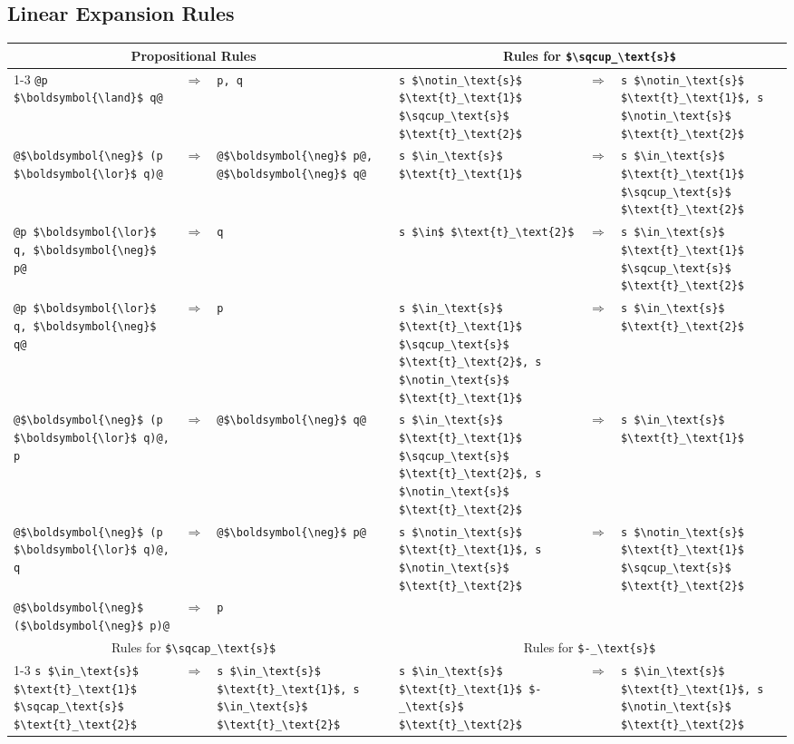 \documentclass[sigplan,10pt,anonymous,review]{acmart}
\newcommand{\unionS}{\sqcup_\text{s}}
\newcommand{\interS}{\sqcap_\text{s}}
\newcommand{\diffS}{-_\text{s}}
\newcommand{\inS}{\in_\text{s}}
\newcommand{\notinS}{\notin_\text{s}}
\newcommand{\fmAnd}[2]{#1 $\boldsymbol{\land}$ #2}
\newcommand{\fmOr}[2]{#1 $\boldsymbol{\lor}$ #2}
\newcommand{\fmNegSymbol}{\boldsymbol{\neg}}
\newcommand{\fmNeg}[1]{$\fmNegSymbol$ #1}
\begin{document}
\subsection{Linear Expansion Rules}
\begin{table*}
  \newcommand{\ton}{\text{t}_\text{1}}
  \newcommand{\ttw}{\text{t}_\text{2}}
  \begin{tabular}{p{}cp{} p{} p{}cp{}}
    \toprule
    \multicolumn{3}{c}{Propositional Rules} && \multicolumn{3}{c}{Rules for \lstinline!$\unionS$!} \\
    \cmidrule{1-3}\cmidrule{5-7}
    \lstinline!@\fmAnd{p}{q}@! & $\Longrightarrow$ & \lstinline!p, q! &&
    \lstinline!s $\notinS$ $\ton$ $\unionS$ $\ttw$! & $\Longrightarrow$ & \lstinline!s $\notinS$ $\ton$, s $\notinS$ $\ttw$! \\

    \lstinline!@\fmNeg{(\fmOr{p}{q})}@! & $\Longrightarrow$ & \lstinline!@\fmNeg{p}@, @\fmNeg{q}@! &&
    \lstinline!s $\inS$ $\ton$! & $\Longrightarrow$ & \lstinline!s $\inS$ $\ton$ $\unionS$ $\ttw$! \\

    \lstinline!@\fmOr{p}{q}, \fmNeg{p}@! & $\Longrightarrow$ & \lstinline!q! &&
    \lstinline!s $\in$ $\ttw$! & $\Longrightarrow$ & \lstinline!s $\inS$ $\ton$ $\unionS$ $\ttw$! \\

    \lstinline!@\fmOr{p}{q}, \fmNeg{q}@! & $\Longrightarrow$ & \lstinline!p! &&
    \lstinline!s $\inS$ $\ton$ $\unionS$ $\ttw$, s $\notinS$ $\ton$! & $\Longrightarrow$ & \lstinline!s $\inS$ $\ttw$! \\

    \lstinline!@\fmNeg{(\fmOr{p}{q})}@, p! & $\Longrightarrow$ & \lstinline!@\fmNeg{q}@! &&
    \lstinline!s $\inS$ $\ton$ $\unionS$ $\ttw$, s $\notinS$ $\ttw$! & $\Longrightarrow$ & \lstinline!s $\inS$ $\ton$! \\

    \lstinline!@\fmNeg{(\fmOr{p}{q})}@, q! & $\Longrightarrow$ & \lstinline!@\fmNeg{p}@! &&
    \lstinline!s $\notinS$ $\ton$, s $\notinS$ $\ttw$! & $\Longrightarrow$ & \lstinline!s $\notinS$ $\ton$ $\unionS$ $\ttw$! \\
    \lstinline!@\fmNeg{(\fmNeg{p})}@! & $\Longrightarrow$ & \lstinline!p! &&&& \\[3ex]


    \multicolumn{3}{c}{Rules for \lstinline!$\interS$!} && \multicolumn{3}{c}{Rules for \lstinline!$\diffS$!} \\
    \cmidrule{1-3}\cmidrule{5-7}
    \lstinline!s $\inS$ $\ton$ $\interS$ $\ttw$! & $\Longrightarrow$ & \lstinline!s $\inS$ $\ton$, s $\inS$ $\ttw$! &&
    \lstinline!s $\inS$ $\ton$ $\diffS$ $\ttw$! & $\Longrightarrow$ & \lstinline!s $\inS$ $\ton$, s $\notinS$ $\ttw$! \\


\end{tabular}
\end{table*}
\end{document}

